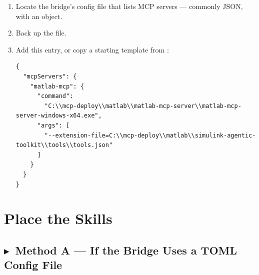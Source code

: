 \documentclass[11pt, letterpaper]{article}
\newcommand{\methodA}{\subsection*{\color{TSblue}$\blacktriangleright$~Method A --- If the Bridge Uses a TOML Config File}}
\begin{document}
\begin{enumerate}
  \item Locate the bridge's config file that lists MCP servers --- commonly JSON, with an
         object.

  \item Back up the file.

  \item Add this entry, or copy a starting template from
        :

  \begin{codeblock}
  \begin{Verbatim}
{
  "mcpServers": {
    "matlab-mcp": {
      "command":
        "C:\\mcp-deploy\\matlab\\matlab-mcp-server\\matlab-mcp-server-windows-x64.exe",
      "args": [
        "--extension-file=C:\\mcp-deploy\\matlab\\simulink-agentic-toolkit\\tools\\tools.json"
      ]
    }
  }
}
  \end{Verbatim}
  \end{codeblock}
\end{enumerate}


\section{Place the Skills}

\methodA
\end{document}
